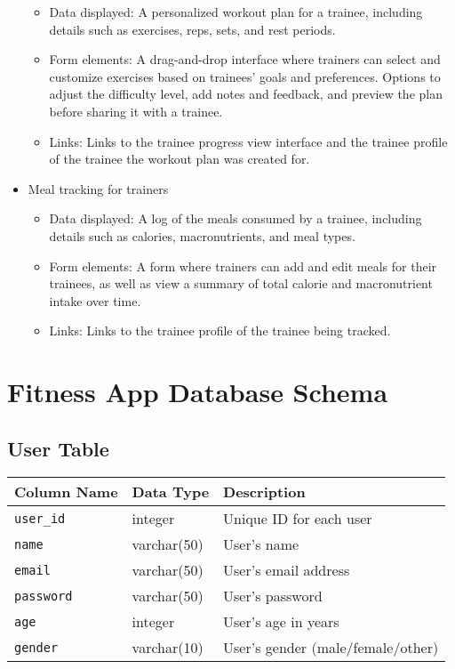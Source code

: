 \documentclass{article}
\begin{document}
\begin{itemize}
    \begin{itemize}
        \item Data displayed: A personalized workout plan for a trainee, including details such as exercises, reps, sets, and rest periods.
        \item Form elements: A drag-and-drop interface where trainers can select and customize exercises based on trainees' goals and preferences. Options to adjust the difficulty level, add notes and feedback, and preview the plan before sharing it with a trainee.
        \item Links: Links to the trainee progress view interface and the trainee profile of the trainee the workout plan was created for.
    \end{itemize}
\item Meal tracking for trainers
    \begin{itemize}
        \item Data displayed: A log of the meals consumed by a trainee, including details such as calories, macronutrients, and meal types.
        \item Form elements: A form where trainers can add and edit meals for their trainees, as well as view a summary of total calorie and macronutrient intake over time.
        \item Links: Links to the trainee profile of the trainee being tracked.
    \end{itemize}
\end{itemize}


\section{Fitness App Database Schema}

\subsection*{User Table}

\begin{tabular}{lll}
\toprule
Column Name & Data Type & Description \\
\midrule
\verb!user_id! & integer & Unique ID for each user \\
\verb!name! & varchar(50) & User's name \\
\verb!email! & varchar(50) & User's email address \\
\verb!password! & varchar(50) & User's password \\
\verb!age! & integer & User's age in years \\
\verb!gender! & varchar(10) & User's gender (male/female/other) \\
\bottomrule
\end{tabular}
\end{document}
